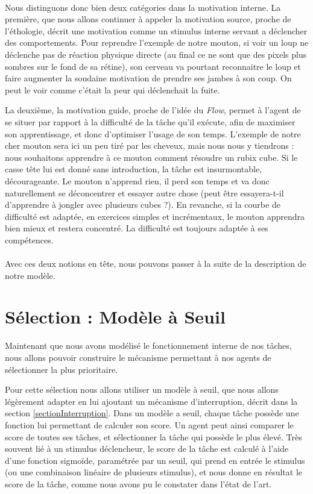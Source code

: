         \paragraph{}
        Nous distinguons donc bien deux catégories dans la motivation interne. La première, que nous allons continuer à appeler la motivation source, proche de l'éthologie, décrit une motivation comme un stimulus interne servant a déclencher des comportements. Pour reprendre l'exemple de notre mouton, si voir un loup ne déclenche pas de réaction physique directe (au final ce ne sont que des pixels plus sombres sur le fond de sa rétine), son cerveau va pourtant reconnaitre le loup et faire augmenter la soudaine motivation de prendre ses jambes à son coup. On peut le voir comme c'était la peur qui déclenchait la fuite.
        
        La deuxième, la motivation guide, proche de l'idée du \textit{Flow}, permet à l'agent de se situer par rapport à la difficulté de la tâche qu'il exécute, afin de maximiser son apprentissage, et donc d'optimiser l'usage de son temps. L'exemple de notre cher mouton sera ici un peu tiré par les cheveux, mais nous nous y tiendrons : nous souhaitons apprendre à ce mouton comment résoudre un rubix cube. Si le casse tête lui est donné sans introduction, la tâche est insurmontable, décourageante. Le mouton n'apprend rien, il perd son temps et va donc naturellement se déconcentrer et essayer autre chose (peut être essayera-t-il d'apprendre à jongler avec plusieurs cubes ?). En revanche, si la courbe de difficulté est adaptée, en exercices simples et incrémentaux, le mouton apprendra bien mieux et restera concentré. La difficulté est toujours adaptée à ses compétences.
        
        \paragraph{}
        Avec ces deux notions en tête, nous pouvons passer à la suite de la description de notre modèle.
			
	\section{Sélection : Modèle à Seuil}
		Maintenant que nous avons modélisé le fonctionnement interne de nos tâches, nous allons pouvoir construire le mécanisme permettant à nos agents de sélectionner la plus prioritaire.
		
			Pour cette sélection nous allons utiliser un modèle à seuil, que nous allons légèrement adapter en lui ajoutant un mécanisme d'interruption, décrit dans la section \ref{sectionInterruption}. Dans un modèle a seuil, chaque tâche possède une fonction lui permettant de calculer son score. Un agent peut ainsi comparer le score de toutes ses tâches, et sélectionner la tâche qui possède le plus élevé. Très souvent lié à un stimulus déclencheur, le score de la tâche est calculé à l'aide d'une fonction sigmoïde, paramétrée par un seuil, qui prend en entrée le stimulus (ou une combinaison linéaire de plusieurs stimulus), et nous donne en résultat le score de la tâche, comme nous avons pu le constater dans l'état de l'art.	
			
